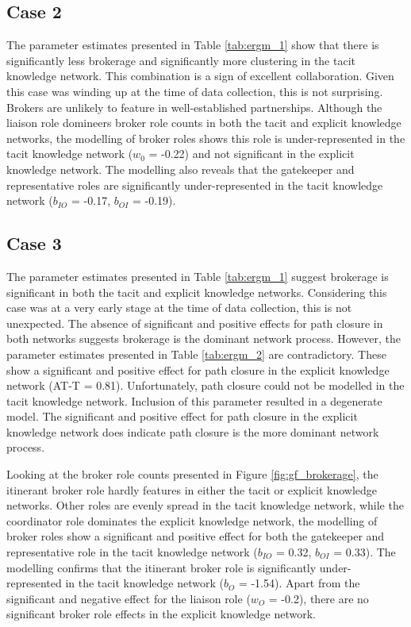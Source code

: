 \subsection{Case 2}

The parameter estimates presented in Table \ref{tab:ergm_1} show that there is significantly less brokerage and significantly more clustering in the tacit knowledge network. This combination is a sign of excellent collaboration. Given this case was winding up at the time of data collection, this is not surprising. Brokers are unlikely to feature in well-established partnerships. Although the liaison role domineers broker role counts in both the tacit and explicit knowledge networks, the modelling of broker roles shows this role is under-represented in the tacit knowledge network ($w_0$ = -0.22) and not significant in the explicit knowledge network. The modelling also reveals that the gatekeeper and representative roles are significantly under-represented in the tacit knowledge network ($b_{IO}$ = -0.17, $b_{OI}$ = -0.19). 

\subsection{Case 3}

The parameter estimates presented in Table \ref{tab:ergm_1} suggest brokerage is significant in both the tacit and explicit knowledge networks. Considering this case was at a very early stage at the time of data collection, this is not unexpected. The absence of significant and positive effects for path closure in both networks suggests brokerage is the dominant network process. However, the parameter estimates presented in Table \ref{tab:ergm_2} are contradictory. These show a significant and positive effect for path closure in the explicit knowledge network (AT-T = 0.81). Unfortunately, path closure could not be modelled in the tacit knowledge network. Inclusion of this parameter resulted in a degenerate model. The significant and positive effect for path closure in the explicit knowledge network does indicate path closure is the more dominant network process. \medskip 

Looking at the broker role counts presented in Figure \ref{fig:gf_brokerage}, the itinerant broker role hardly features in either the tacit or explicit knowledge networks. Other roles are evenly spread in the tacit knowledge network, while the coordinator role dominates the explicit knowledge network, the modelling of broker roles show a significant and positive effect for both the gatekeeper and representative role in the tacit knowledge network ($b_{IO}$ = 0.32, $b_{OI}$ = 0.33). The modelling confirms that the itinerant broker role is significantly under-represented in the tacit knowledge network ($b_O$ = -1.54). Apart from the significant and negative effect for the liaison role ($w_O$ = -0.2), there are no significant broker role effects in the explicit knowledge network. \medskip  

